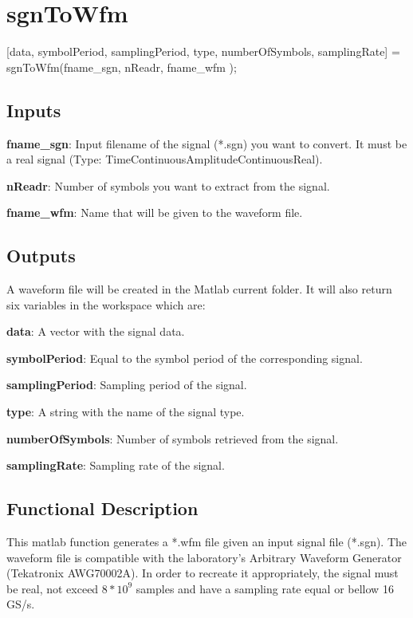 \clearpage

\section{sgnToWfm}

[data, symbolPeriod, samplingPeriod, type, numberOfSymbols, samplingRate] = sgnToWfm(fname\_sgn, nReadr, fname\_wfm );

\subsection*{Inputs}

\indent

\textbf{fname\_sgn}: Input filename of the signal (*.sgn) you want to convert. It must be a real signal (Type: TimeContinuousAmplitudeContinuousReal). 
\bigskip

\textbf{nReadr}: Number of symbols you want to extract from the signal.
\bigskip

\textbf{fname\_wfm}: Name that will be given to the waveform file.

\subsection*{Outputs}
A waveform file will be created in the Matlab current folder. It will also return six variables in the workspace which are:
\bigskip

\textbf{data}: A vector with the signal data.
\bigskip

\textbf{symbolPeriod}: Equal to the symbol period of the corresponding signal.
\bigskip

\textbf{samplingPeriod}: Sampling period of the signal.
\bigskip

\textbf{type}: A string with the name of the signal type.
\bigskip

\textbf{numberOfSymbols}: Number of symbols retrieved from the signal.
\bigskip

\textbf{samplingRate}: Sampling rate of the signal.


\subsection*{Functional Description}

This matlab function generates a *.wfm file given an input signal file (*.sgn). The waveform file is compatible with the laboratory's Arbitrary Waveform Generator (Tekatronix AWG70002A). In order to recreate it appropriately, the signal must be real, not exceed $8*10^9$ samples and have a sampling rate equal or bellow 16 GS/s. 


